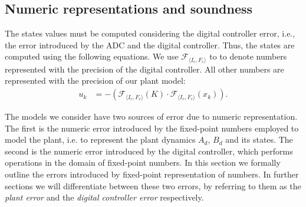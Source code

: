 \documentclass[runningheads,a4paper]{llncs}
\begin{document}
\subsection{Numeric representations and soundness} 
\label{sec:numeric_rep}

The states values must be computed considering the digital controller error, i.e., the error introduced by the ADC and the digital controller. 
Thus, the states are computed using the following equations. We use $\mathcal{F}_{\langle I_c,F_c \rangle}$ 
to to denote numbers represented with the precision of the digital controller. All other numbers
are represented with the precision of our plant model:
%
\begin{align*}
u_{k}&=-(\mathcal{F}_{\langle I_c,F_c \rangle}(K)\cdot\mathcal{F}_{\langle I_c,F_c \rangle}(x_{k})).  
\end{align*}

\bigskip

The 
models we consider have two sources of error due to numeric representation. 
The first is the numeric error introduced by the fixed-point numbers employed to model the plant, i.e. to represent the plant dynamics $A_d$, $B_d$ and its states. 
The second is the numeric error introduced by the digital controller, 
which 
performs operations in the domain of fixed-point numbers. 
In this section we formally outline the errors introduced by fixed-point representation of numbers. 
In further sections we will differentiate between these two errors, 
by referring to them as the \emph{plant error} and the \emph{digital controller error} respectively. 
\end{document}
